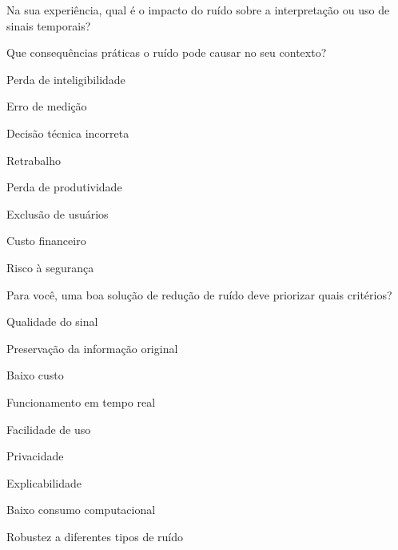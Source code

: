\newpage


\begin{perguntaFormulario}{Na sua experiência, qual é o impacto do ruído sobre a interpretação ou uso de sinais temporais?}
\end{perguntaFormulario}

\begin{perguntaFormulario}{Que consequências práticas o ruído pode causar no seu contexto?}
\begin{opcoesFormularioDuasColunas}
    \item Perda de inteligibilidade
    \item Erro de medição
    \item Decisão técnica incorreta
    \item Retrabalho
    \item Perda de produtividade
    \item Exclusão de usuários
    \item Custo financeiro
    \item Risco à segurança
\end{opcoesFormularioDuasColunas}
\end{perguntaFormulario}

\begin{perguntaFormulario}{Para você, uma boa solução de redução de ruído deve priorizar quais critérios?}
\begin{opcoesFormularioDuasColunas}
    \item Qualidade do sinal
    \item Preservação da informação original
    \item Baixo custo
    \item Funcionamento em tempo real
    \item Facilidade de uso
    \item Privacidade
    \item Explicabilidade
    \item Baixo consumo computacional
    \item Robustez a diferentes tipos de ruído
\end{opcoesFormularioDuasColunas}
\end{perguntaFormulario}

